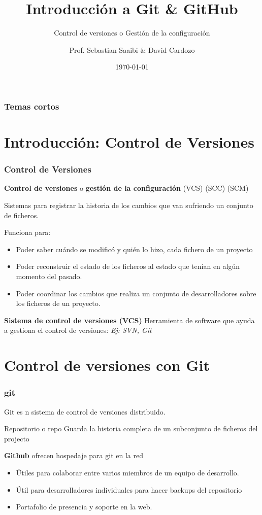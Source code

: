 \documentclass{beamer}
\author{Prof. Sebastian Saaibi \& David Cardozo\inst{1}}
\title{Introducción a Git \& GitHub }
\subtitle{Control de versiones o Gestión de la configuración} %
\institute[Universidad de los Andes]
{
	\inst{1}%
	Física   \\
	Lectura $6$ Herramientas Computacionales \\
	Universidad de los Andes
}
\date{\today} %
\begin{document}
\maketitle
\begin{frame}
	\frametitle{Temas cortos}
	\tableofcontents
\end{frame}


\section{Introducción: Control de Versiones}

\begin{frame}
	\frametitle{Control de Versiones}
	
	\textbf{Control de versiones} o \textbf{gestión de la configuración} (VCS) (SCC) (SCM)
	
	Sistemas para registrar la historia de los cambios que van sufriendo un conjunto de ficheros.
	
	 Funciona para:
	 \begin{itemize}
	 	\item Poder saber cuándo se modificó y quién lo hizo, cada fichero de un proyecto
	 	\item Poder reconstruir el estado de los ficheros al estado que tenían en algún momento del pasado.
	 	\item Poder coordinar los cambios que realiza un conjunto de desarrolladores sobre los ficheros de un proyecto.
	 	
	 \end{itemize}
	 
	 \textbf{Sistema de control de versiones (VCS)}
	 Herramienta de software que ayuda a gestiona el control de versiones: \textit{Ej: SVN, Git}
\end{frame}

\section{Control de versiones con Git}

\begin{frame}[allowframebreaks]
	\frametitle{git}
	Git es n sistema de control de versiones distribuido.
	\begin{block}{Repositorio o repo}
		Guarda la historia completa de un subconjunto de ficheros del projecto
	\end{block}
	
	\textbf{Github} ofrecen hospedaje para git en la red
	\begin{itemize}
		\item Útiles para colaborar entre varios miembros de un equipo de desarrollo.
		\item Útil para desarrolladores individuales para hacer backups del repositorio
		\item Portafolio de presencia y soporte en la web.
	\end{itemize}
\end{frame}
\end{document}
